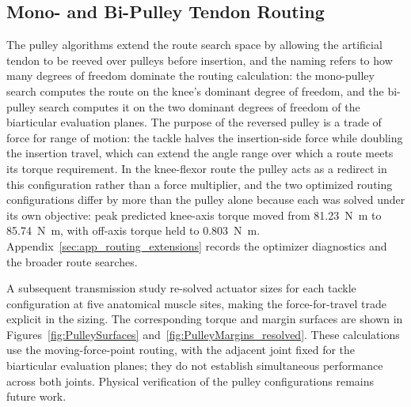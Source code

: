 \subsection{Mono- and Bi-Pulley Tendon Routing}\label{sec:disc_pulley}

The pulley algorithms extend the route search space by allowing the artificial tendon to be reeved over pulleys before insertion, and the naming refers to how many degrees of freedom dominate the routing calculation: the mono-pulley search computes the route on the knee's dominant degree of freedom, and the bi-pulley search computes it on the two dominant degrees of freedom of the biarticular evaluation planes. The purpose of the reversed pulley is a trade of force for range of motion: the tackle halves the insertion-side force while doubling the insertion travel, which can extend the angle range over which a route meets its torque requirement. In the knee-flexor route the pulley acts as a redirect in this configuration rather than a force multiplier, and the two optimized routing configurations differ by more than the pulley alone because each was solved under its own objective: peak predicted knee-axis torque moved from \qty{81.23}{\newton\meter} to \qty{85.74}{\newton\meter}, with off-axis torque held to \qty{0.803}{\newton\meter}. Appendix~\ref{sec:app_routing_extensions} records the optimizer diagnostics and the broader route searches.

A subsequent transmission study re-solved actuator sizes for each tackle configuration at five anatomical muscle sites, making the force-for-travel trade explicit in the sizing. The corresponding torque and margin surfaces are shown in Figures~\ref{fig:PulleySurfaces} and~\ref{fig:PulleyMargins_resolved}. These calculations use the moving-force-point routing, with the adjacent joint fixed for the biarticular evaluation planes; they do not establish simultaneous performance across both joints. Physical verification of the pulley configurations remains future work.
